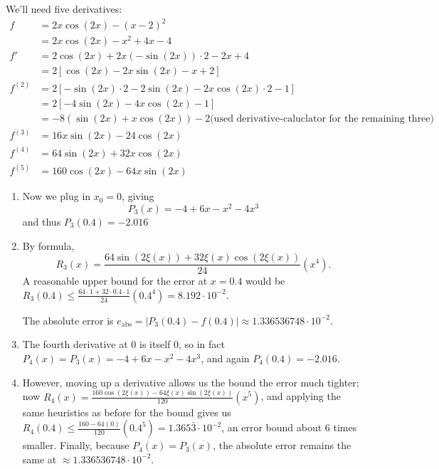 \documentclass{article}
\newcommand{\abs}[1]{\left| #1 \right|}
\newcommand{\brac}[1]{\left[ #1 \right]}
\newcommand{\paren}[1]{\left( #1 \right)}
\begin{document}
We'll need five derivatives:
\begin{align*}
    f &= 2x\cos(2x) - (x - 2)^2 \\
    &= 2x \cos(2x) -x^2 + 4x - 4 \\
    f' &= 2\cos(2x) + 2x\paren{-\sin(2x)}\cdot 2 - 2x + 4 \\
    &= 2\brac{\cos(2x) - 2x\sin(2x) - x + 2} \\
    f^{(2)} &= 2\brac{-\sin(2x) \cdot 2 - 2\sin(2x) - 2x\cos(2x) \cdot 2 - 1} \\
    &= 2\brac{-4\sin(2x) - 4x \cos(2x) - 1} \\
    &= -8\paren{\sin(2x) + x\cos(2x)} - 2
    \text{(used derivative-caluclator for the remaining three)} \\
    f^{(3)} &= 16 x \sin (2x) - 24\cos(2x) \\
    f^{(4)} &= 64 \sin(2x) + 32x \cos(2x) \\
    f^{(5)} &= 160 \cos(2x) - 64 x \sin(2x)
\end{align*}
\begin{enumerate}
    \item 
    Now we plug in $x_0 = 0$, giving
    $$P_3(x) = -4 + 6x - x^2 - 4x^3$$
    and thus $P_3(0.4) = -2.016$

    \item 
    By formula,
    $$R_3(x) = \frac{64\sin(2\xi(x)) + 32 \xi(x) \cos(2\xi(x))}{24}(x^4).$$
    A reasonable upper bound for the error at $x = 0.4$ would be $R_3(0.4) \le \frac{64 \cdot 1 + 32 \cdot 0.4 \cdot 1}{24}(0.4^4) = 8.192 \cdot 10^{-2}$.

    The absolute error is $e_{\text{abs}} = \abs{P_3(0.4) - f(0.4)} \approx 1.336536748 \cdot 10^{-2}$.

    \item 
    The fourth derivative at $0$ is itself $0$, so in fact $P_4(x) = P_3(x) = -4 + 6x - x^2 - 4x^3$, and again $P_4(0.4) = -2.016$.

    \item 
    However, moving up a derivative allows us the bound the error much tighter; now $R_4(x) = \frac{160\cos(2\xi(x)) - 64 \xi(x) \sin(2\xi(x))}{120}(x^5)$, and applying the same heuristics as before for the bound gives us $R_4(0.4) \le \frac{160 - 64(0)}{120}(0.4^5) = 1.365\bar{3} \cdot 10^{-2}$, an error bound about  6 times smaller. Finally, because $P_4(x) = P_3(x)$, the absolute error remains the same at $\approx 1.336536748 \cdot 10^{-2}$.
\end{enumerate}
\end{document}
